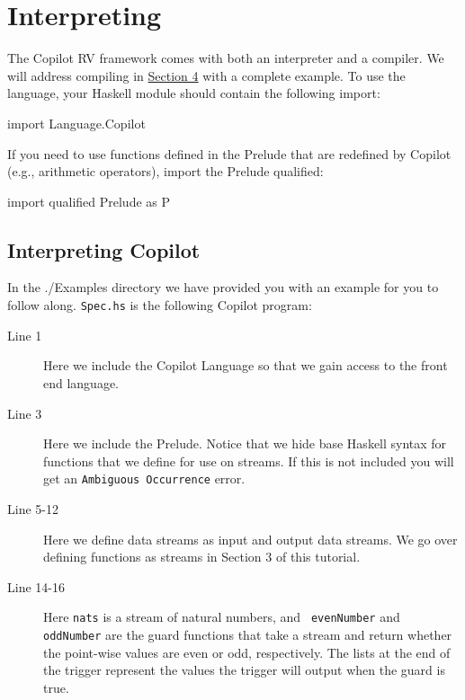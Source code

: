 \newpage 
\section{Interpreting}
\label{interpcompile}
The Copilot RV framework comes with both an interpreter and a
compiler. We will address compiling in \hyperref[sec:complete_example]{Section 4}
 with a complete example. 
\noindent To use the language, your Haskell module should contain the following import:
%
\begin{code}
import Language.Copilot
\end{code}
%
If you need to use functions defined in the Prelude that are redefined by
Copilot (e.g., arithmetic operators), import the Prelude qualified:
%
\begin{code}
import qualified Prelude as P
\end{code}

\subsection{Interpreting Copilot}
In the ./Examples directory we have provided you with an example
for you to follow along. \texttt{Spec.hs} is the following Copilot program:
%


\begin{description}
  \item[Line 1] Here we include the Copilot Language so that we gain access to the
  front end language.
  \item[Line 3] Here we include the Prelude. Notice that we hide base Haskell
  syntax for functions that we define for use on streams. If this is not
  included you will get an \texttt{Ambiguous Occurrence} error. 
  \item[Line 5-12] Here we define data streams as input and output data streams. We
  go over defining functions as streams in Section 3 of this tutorial. 
  \item[Line 14-16] Here {\tt nats} is a stream of natural numbers, and {\tt
  evenNumber} and {\tt oddNumber} are the guard functions that take a stream and
  return whether the point-wise values are even or odd, respectively. The lists
  at the end of the trigger represent the values the trigger will output when the
  guard is true.

\end{description}

